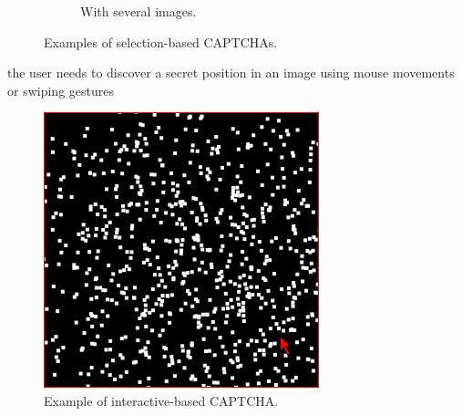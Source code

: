 \begin{itemize}
{\begin{figure}[h]
\begin{subfigure}[b]{0.48\textwidth}
         \caption{\footnotesize{With several images.}}
        \label{soa:selection2}
     \end{subfigure}
     \caption{\footnotesize{Examples of selection-based CAPTCHAs.}}
\end{figure}
}
{the user needs to discover a secret position in an image using mouse movements or swiping gestures
\begin{figure}[h]
     \centering
     \includegraphics[width=.45\linewidth]{Images/StateOfArt/interactive_CAPTCHA}
     \caption{\footnotesize{Example of interactive-based CAPTCHA.}}\label{soa:interactive_CAPTCHA}
\end{figure}
}
\end{itemize}

